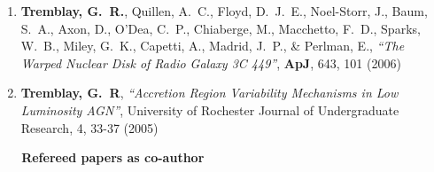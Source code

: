 \documentclass[11pt]{article}
\begin{document}
\begin{enumerate}
\item \textbf{Tremblay, G.~R.}, Quillen, A.~C., Floyd, D.~J.~E., Noel-Storr, J., Baum,
S.~A., Axon, D., O'Dea, C.~P., Chiaberge, M., Macchetto, F.~D., Sparks,
W.~B., Miley, G.~K., Capetti, A., Madrid, J.~P.,
\& Perlman, E.,   \textit{``The Warped Nuclear Disk of Radio Galaxy 3C 449''}, \textbf{ApJ}, 643,  101 (2006)


\item \textbf{Tremblay, G.~R}, \textit{``Accretion Region Variability Mechanisms in Low Luminosity AGN''}, University of Rochester Journal of Undergraduate Research, 4, 33-37 (2005)

\end{enumerate}

\vspace{4mm}

\noindent \textbf{~~~Refereed papers as co-author}
\end{document}

